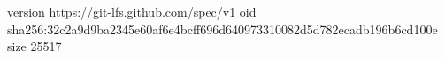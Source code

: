 version https://git-lfs.github.com/spec/v1
oid sha256:32c2a9d9ba2345e60af6e4bcff696d640973310082d5d782ecadb196b6cd100e
size 25517
